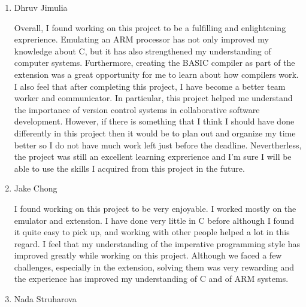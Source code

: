 \documentclass[11pt, letterpaper]{article}
\begin{document}
\begin{enumerate}

\item Dhruv Jimulia

Overall, I found working on this project to be a fulfilling and enlightening exprerience. Emulating an ARM processor has not only improved my knowledge about C, but it has also strengthened my understanding of computer systems. Furthermore, creating the BASIC compiler as part of the extension was a great opportunity for me to learn about how compilers work. I also feel that after completing this project, I have become a better team worker and communicator. In particular, this project helped me understand the importance of version control systems in collaborative software development. However, if there is something that I think I should have done differently in this project then it would be to plan out and organize my time better so I do not have much work left just before the deadline. Nevertherless, the project was still an excellent learning exprerience and I'm sure I will be able to use the skills I acquired from this project in the future.

\item Jake Chong

I found working on this project to be very enjoyable. I worked mostly on the emulator and extension. I have done very little in C before although I found it quite easy to pick up, and working with other people helped a lot in this regard. I feel that my understanding of the imperative programming style has improved greatly while working on this project. Although we faced a few challenges, especially in the extension, solving them was very rewarding and the experience has improved my understanding of C and of ARM systems.  

\item Nada Struharova


\end{enumerate}
\end{document}
